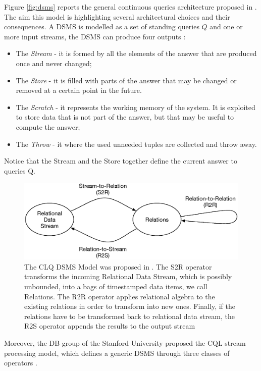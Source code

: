 Figure \ref{fig:dsms} reports the general continuous queries architecture proposed in \cite{Babu:2001:CQO:603867.603884}. The aim this model is highlighting several architectural choices and their consequences. A DSMS is modelled as a set of standing queries $Q$ and one or more input streams, the DSMS can produce four outputs \cite{Cugola:2012:PFI:2187671.2187677}:

\begin{itemize}
\item The \textit{Stream} - it is formed by all the elements of the answer that are produced once and never changed;
\item The \textit{Store} - it is filled with parts of the answer that may be changed or removed at a certain point in the future. 
\item The \textit{Scratch} - it represents the working memory of the system. It is exploited to store data that is not part of the answer, but that may be useful to compute the answer;
\item The \textit{Throw} - it where the used unneeded tuples are collected and throw away.
\end{itemize}

Notice that the Stream and the Store together define the current answer to queries Q.


\begin{figure}[tbh]
  \centering
	\includegraphics[width=\linewidth]{images/cql-model}
	\caption[CLQ DSMS Model]{The CLQ DSMS Model was proposed in \cite{Arasu2006}. The S2R operator transforms the incoming Relational Data Stream, which is possibly unbounded, into a bags of timestamped data items, we call Relations. The R2R operator applies relational algebra to the existing relations in order to transform into new ones. Finally, if the relations have to be transformed back to relational data stream, the R2S operator appends the results to the output stream} 
  	\label{fig:cql}
\end{figure}

Moreover, the DB group of the Stanford University proposed the CQL stream processing model, which defines a generic DSMS through three classes of operators \cite{Arasu2006}.

